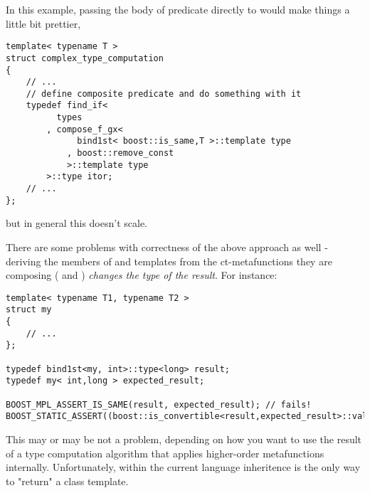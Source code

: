 \documentclass{netobjectdays}
\begin{document}

In this example, passing the body of 
 predicate directly to 
 would make things a little bit prettier, 


{\footnotesize
\begin{verbatim}
template< typename T >
struct complex_type_computation
{
    // ...
    // define composite predicate and do something with it
    typedef find_if<
          types
        , compose_f_gx<
              bind1st< boost::is_same,T >::template type
            , boost::remove_const
            >::template type
        >::type itor;
    // ...
};
\end{verbatim}
}

but in general this doesn't scale. 

There are some problems with correctness of the above 
approach as well - deriving the  members of 
 and  templates from 
the ct-metafunctions they are composing ( and 
) \emph{changes the type of the result}. 
For instance:

{\footnotesize
\begin{verbatim}
template< typename T1, typename T2 >
struct my
{
    // ...
};

typedef bind1st<my, int>::type<long> result;
typedef my< int,long > expected_result;

BOOST_MPL_ASSERT_IS_SAME(result, expected_result); // fails!
BOOST_STATIC_ASSERT((boost::is_convertible<result,expected_result>::value));
\end{verbatim}
}

This may or may be not a problem, depending on how you 
want to use the result of a type computation algorithm 
that applies higher-order metafunctions internally. 
Unfortunately, within the current language inheritence 
is the only way to "return" a class template.


\end{document}
